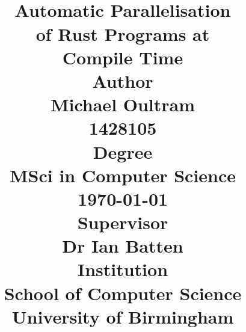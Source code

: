 \documentclass[11pt, a4paper]{article}
\title{
	 \\
	\vspace{1em}
	\LARGE\textbf{Automatic Parallelisation \\ of Rust Programs at \\  Compile Time} \\
	\vspace{2em}
	\small\textbf{Author} \\
	\Large\textrm{Michael Oultram} \\
	\normalsize\textrm{1428105} \\
	\vspace{2em}
	\small\textbf{Degree} \\
	\Large\textrm{MSci in Computer Science} \\
	\normalsize\textrm{\today} \\
	\vspace{2em}
	\small\textbf{Supervisor} \\
	\Large\textrm{Dr Ian Batten} \\
	\vspace{2em}
	\small\textbf{Institution} \\
	\Large\textrm{School of Computer Science \\ University of Birmingham}
}
\date{}
\begin{document}
\begin{titlepage}
\maketitle
\thispagestyle{empty}
\end{titlepage}

\tableofcontents
\pagebreak









\end{document}
